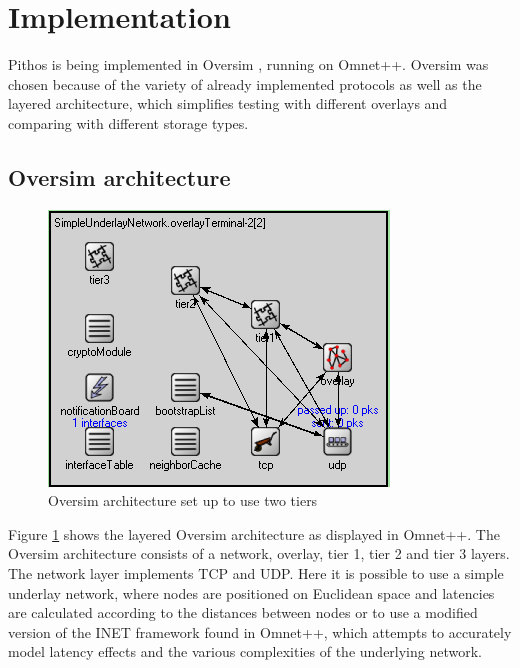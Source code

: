 \documentclass[10pt,a4paper,conference]{IEEEtran}
\begin{document}
\section{Implementation}
\label{implementation}

Pithos is being implemented in Oversim \cite{OverSim_2007}, running on Omnet++. Oversim was chosen because of the variety of already implemented
protocols as well as the layered architecture, which simplifies testing with different overlays and comparing with different storage types.

\subsection{Oversim architecture}

\begin{figure}[htbp]
 \centering
 \includegraphics[width=\columnwidth]{Oversim_arch}
 \caption{Oversim architecture set up to use two tiers}
 \label{fig_oversim_arch}
\end{figure}
%
Figure \ref{fig_oversim_arch} shows the layered Oversim architecture as displayed in Omnet++. The Oversim architecture consists of a network,
overlay, tier 1, tier 2 and tier 3 layers. The network layer implements TCP and UDP. Here it is possible to use a simple underlay network, where
nodes are positioned on Euclidean space and latencies are calculated according to the distances between nodes or to use a modified version of the
INET framework found in Omnet++, which attempts to accurately model latency effects and the various complexities of the underlying network.
\end{document}
